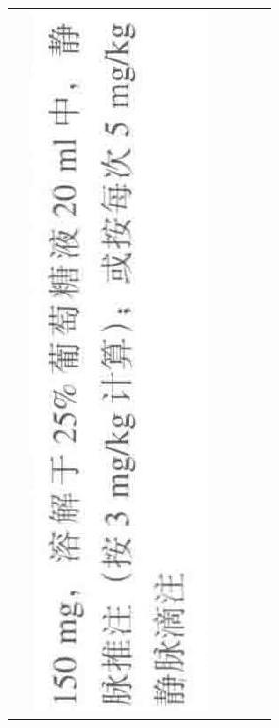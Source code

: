 \documentclass[10pt]{article}
\begin{document}
\begin{center}
\begin{tabular}{|c|c|c|c|c|c|}
 & \includegraphics[max width=\textwidth]{2024_07_05_645bb794a4d4f32ee0c8g-352(18)}

\end{tabular}
\end{center}
\end{document}
